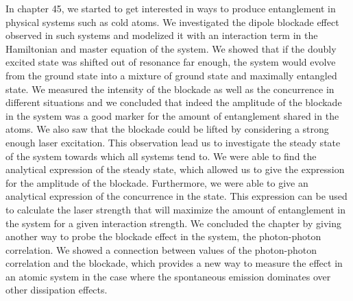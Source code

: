 In chapter 45, we started to get interested in ways to produce entanglement in physical systems such as cold atoms. We investigated the dipole blockade effect observed in such systems and modelized it with an interaction term in the Hamiltonian and master equation of the system. We showed that if the doubly excited state was shifted out of resonance far enough, the system would evolve from the ground state into a mixture of ground state and maximally entangled state. We measured the intensity of the blockade as well as the concurrence in different situations and we concluded that indeed the amplitude of the blockade in the system was a good marker for the amount of entanglement shared in the atoms. We also saw that the blockade could be lifted by considering a strong enough laser excitation. This observation lead us to investigate the steady state of the system towards which all  systems tend to. We were able to find the analytical expression of the steady state, which allowed us to give the expression for the amplitude of the blockade. Furthermore, we were able to give an analytical expression of the concurrence in the state. This expression can be used to calculate the laser strength that will maximize the amount of entanglement in the system for a given interaction strength. We concluded the chapter by giving another way to probe the blockade effect in the system, the photon-photon correlation. We showed a connection between values of the photon-photon correlation and the blockade, which provides a new way to measure the effect in an atomic system in the case where the spontaneous emission dominates over other dissipation effects.


